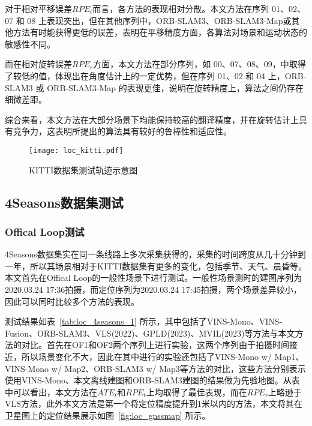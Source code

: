 对于相对平移误差$RPE_t$而言，各方法的表现相对分散。本文方法在序列 01、02、07 和 08 上表现突出，但在其他序列中，ORB-SLAM3、ORB-SLAM3-Map或其他方法有时能获得更低的误差，表明在平移精度方面，各算法对场景和运动状态的敏感性不同。

而在相对旋转误差$RPE_r$方面，本文方法在部分序列，如 00、07、08、09，中取得了较低的值，体现出在角度估计上的一定优势，但在序列 01、02 和 04 上，ORB-SLAM3 或 ORB-SLAM3-Map 的表现更佳，说明在旋转精度上，算法之间仍存在细微差距。

综合来看，本文方法在大部分场景下均能保持较高的翻译精度，并在旋转估计上具有竞争力，这表明所提出的算法具有较好的鲁棒性和适应性。

\begin{figure}
  \centering
  \texttt{[image: loc\_kitti.pdf]}
  \caption{KITTI数据集测试轨迹示意图}
  \label{fig:loc_kitti}
\end{figure}

\subsection{4Seasons数据集测试}
\subsubsection{Offical Loop测试}
4Seasons数据集实在同一条线路上多次采集获得的，采集的时间跨度从几十分钟到一年，所以其场景相对于KITTI数据集有更多的变化，包括季节、天气、晨昏等。本文首先在Offical Loop的一般性场景下进行测试。一般性场景测时的建图序列为2020.03.24 17:36拍摄，而定位序列为2020.03.24 17:45拍摄，两个场景差异较小，因此可以同时比较多个方法的表现。

测试结果如表~\ref{tab:loc_4seasons_1} 所示，其中包括了VINS-Mono、VINS-Fusion、ORB-SLAM3、VLS\cite{yang2022real}(2022)、GPLD\cite{hao2023global}(2023)、MVIL\cite{zhang2023map}(2023)等方法与本文方法的对比。首先在OF1和OF2两个序列上进行实验，这两个序列由于拍摄时间接近，所以场景变化不大，因此在其中进行的实验还包括了VINS-Mono w/ Map1、VINS-Mono w/ Map2、ORB-SLAM3 w/ Map3等方法的对比，这些方法分别表示使用VINS-Mono、本文离线建图和ORB-SLAM3建图的结果做为先验地图。从表中可以看出，本文方法在$ATE_t$和$RPE_t$上均取得了最佳表现，而在$RPE_r$上略逊于VLS方法，此外本文方法是第一个将定位精度提升到1米以内的方法，本文将其在卫星图上的定位结果展示如图~\ref{fig:loc_gnssmap} 所示。

